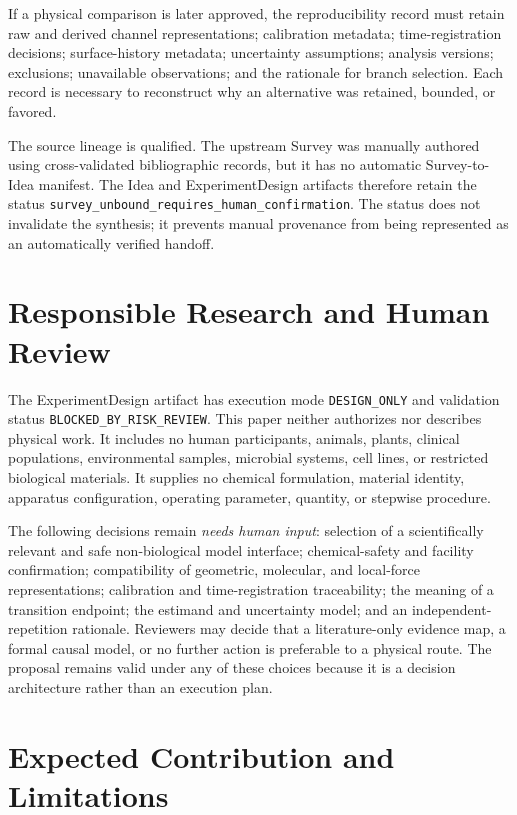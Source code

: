 \documentclass[conference]{IEEEtran}
\begin{document}
If a physical comparison is later approved, the reproducibility record must retain raw and derived channel representations; calibration metadata; time-registration decisions; surface-history metadata; uncertainty assumptions; analysis versions; exclusions; unavailable observations; and the rationale for branch selection. Each record is necessary to reconstruct why an alternative was retained, bounded, or favored.

The source lineage is qualified. The upstream Survey was manually authored using cross-validated bibliographic records, but it has no automatic Survey-to-Idea manifest. The Idea and ExperimentDesign artifacts therefore retain the status \texttt{survey\_\allowbreak unbound\_\allowbreak requires\_\allowbreak human\_\allowbreak confirmation}. The status does not invalidate the synthesis; it prevents manual provenance from being represented as an automatically verified handoff.

\section{Responsible Research and Human Review}

The ExperimentDesign artifact has execution mode \texttt{DESIGN\_ONLY} and validation status \texttt{BLOCKED\_\allowbreak BY\_\allowbreak RISK\_\allowbreak REVIEW}. This paper neither authorizes nor describes physical work. It includes no human participants, animals, plants, clinical populations, environmental samples, microbial systems, cell lines, or restricted biological materials. It supplies no chemical formulation, material identity, apparatus configuration, operating parameter, quantity, or stepwise procedure.

The following decisions remain \emph{needs human input}: selection of a scientifically relevant and safe non-biological model interface; chemical-safety and facility confirmation; compatibility of geometric, molecular, and local-force representations; calibration and time-registration traceability; the meaning of a transition endpoint; the estimand and uncertainty model; and an independent-repetition rationale. Reviewers may decide that a literature-only evidence map, a formal causal model, or no further action is preferable to a physical route. The proposal remains valid under any of these choices because it is a decision architecture rather than an execution plan.

\section{Expected Contribution and Limitations}
\end{document}
